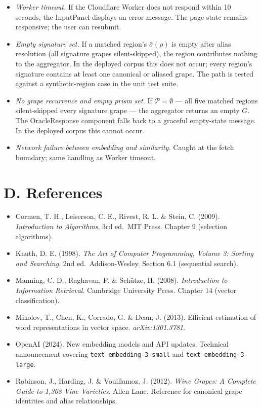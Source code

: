 \documentclass[11pt]{article}
\begin{document}
\begin{itemize}[leftmargin=2em,itemsep=0.2em]
\item \emph{Worker timeout.} If the Cloudflare Worker does not respond within 10 seconds, the InputPanel displays an error message. The page state remains responsive; the user can resubmit.
\item \emph{Empty signature set.} If a matched region's $\bar\sigma(\rho)$ is empty after alias resolution (all signature grapes silent-skipped), the region contributes nothing to the aggregator. In the deployed corpus this does not occur; every region's signature contains at least one canonical or aliased grape. The path is tested against a synthetic-region case in the unit test suite.
\item \emph{No grape recurrence and empty prism set.} If $\mathcal{P} = \emptyset$ --- all five matched regions silent-skipped every signature grape --- the aggregator returns an empty $G$. The OracleResponse component falls back to a graceful empty-state message. In the deployed corpus this cannot occur.
\item \emph{Network failure between embedding and similarity.} Caught at the fetch boundary; same handling as Worker timeout.
\end{itemize}

\section*{D. References}

\begin{itemize}[leftmargin=2em,itemsep=0.2em]
\item Cormen, T. H., Leiserson, C. E., Rivest, R. L. \& Stein, C. (2009). \emph{Introduction to Algorithms}, 3rd ed.\ MIT Press. Chapter 9 (selection algorithms).
\item Knuth, D. E. (1998). \emph{The Art of Computer Programming, Volume 3: Sorting and Searching}, 2nd ed.\ Addison-Wesley. Section 6.1 (sequential search).
\item Manning, C. D., Raghavan, P. \& Sch\"utze, H. (2008). \emph{Introduction to Information Retrieval}. Cambridge University Press. Chapter 14 (vector classification).
\item Mikolov, T., Chen, K., Corrado, G. \& Dean, J. (2013). Efficient estimation of word representations in vector space. \emph{arXiv:1301.3781}.
\item OpenAI (2024). New embedding models and API updates. Technical announcement covering \texttt{text-embedding-3-small} and \texttt{text-embedding-3-large}.
\item Robinson, J., Harding, J. \& Vouillamoz, J. (2012). \emph{Wine Grapes: A Complete Guide to 1,368 Vine Varieties}. Allen Lane. Reference for canonical grape identities and alias relationships.
\end{itemize}
\end{document}
